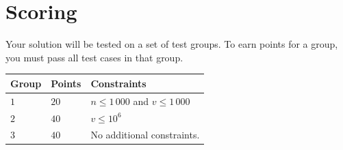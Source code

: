 \section*{Scoring}
Your solution will be tested on a set of test groups.
To earn points for a group, you must pass all test cases in that group.

\noindent
\begin{tabular}{| l | l | p{12cm} |}
  \hline
  \textbf{Group} & \textbf{Points} & \textbf{Constraints} \\ \hline
  $1$ & $20$ & $n \leq 1\,000$ and $v \leq 1\,000$ \\ \hline
  $2$ & $40$ & $v \leq 10^6$ \\ \hline
  $3$ & $40$ & No additional constraints. \\ \hline
\end{tabular}
